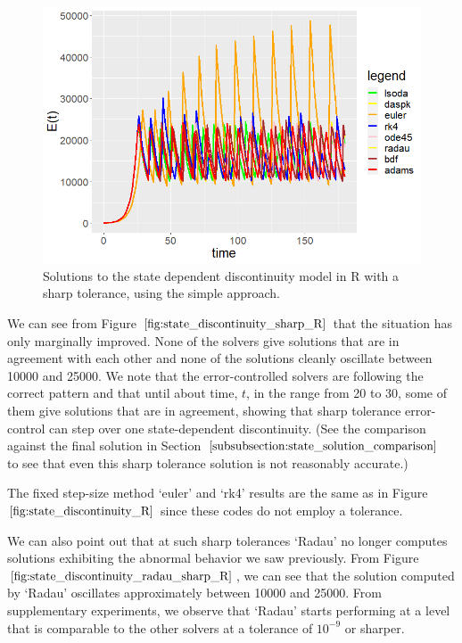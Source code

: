 \begin{figure}[H]
\centering
\includegraphics[width=0.7\linewidth]{./figures/state_discontinuity_sharp_R}
\caption{Solutions to the state dependent discontinuity model in R with a sharp tolerance, using the simple approach.}
\label{fig:state_discontinuity_sharp_R}
\end{figure}

We can see from Figure $\ref{fig:state_discontinuity_sharp_R}$ that the situation has only marginally improved. None of the solvers give solutions that are in agreement with each other and none of the solutions cleanly oscillate between 10000 and 25000. We note that the error-controlled solvers are following the correct pattern and that until about time, $t$, in the range from 20 to 30, some of them give solutions that are in agreement, showing that sharp tolerance error-control can step over one state-dependent discontinuity. (See the comparison against the final solution in Section $\ref{subsubsection:state_solution_comparison}$ to see that even this sharp tolerance solution is not reasonably accurate.)

The fixed step-size method `euler' and `rk4' results are the same as in Figure $\ref{fig:state_discontinuity_R}$ since these codes do not employ a tolerance.

We can also point out that at such sharp tolerances `Radau' no longer computes solutions exhibiting the abnormal behavior we saw previously. From Figure $\ref{fig:state_discontinuity_radau_sharp_R}$, we can see that the solution computed by `Radau' oscillates approximately between 10000 and 25000. From supplementary experiments, we observe that `Radau' starts performing at a level that is comparable to the other solvers at a tolerance of $10^{-9}$ or sharper.

